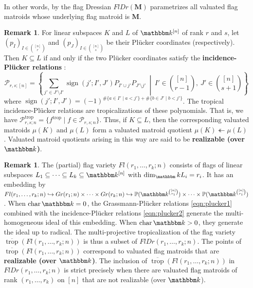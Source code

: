 \documentclass[11pt]{amsart}
\newcommand{\PP}{\mathbb P}
\newcommand{\trop}{\operatorname{trop}}
\newcommand{\MM}{{\boldsymbol M}}
\newcommand{\kk}{\mathbbm k}
\theoremstyle{definition}
\newtheorem{rem}[thm]{Remark}
\begin{document}
In other words, by  the flag Dressian $FlDr(\MM)$ parametrizes all valuated flag matroids whose underlying flag matroid is $\MM$.

\begin{rem}\label{rem:plucker}
For linear subspaces $K$ and $L$ of $\kk^{[n]}$ of rank $r$ and $s$, let $(p_I)_{I\in \binom{[n]}{r}}$ and $(p_J)_{I\in \binom{[n]}{s}}$ be their Pl\"ucker coordinates (respectively).  Then $K\subseteq L$ if and only if the two Pl\"ucker coordinates satisfy the \textbf{incidence-Pl\"ucker relations} \cite[\S 9, Lemma 2]{Ful97}:
\begin{equation}\label{eqn:plucker2}
\mathscr P_{r,s; [n]} = \left\{ \sum_{j'\in J'\setminus I'} \operatorname{sign}(j';I',J') P_{I'\cup j'}P_{J'\setminus j'} \ \middle| \ I'\in \binom{[n]}{r-1}, \ J' \in \binom{[n]}{s+1} \right\}
\end{equation}
where $\operatorname{sign}(j';I',J') = (-1)^{\#\{a\in I' \mid a< j'\} + \#\{b\in J' \mid b<j'\}}$.
The tropical incidence-Pl\"ucker relations are tropicalizations of these polynomials.  That is, we have $\mathscr P_{r,s;n}^{\trop} = \{f^{\trop} \mid f\in \mathscr P_{r,s;n}\}$.  Thus, if $K\subseteq L$, then the corresponding valuated matroids $\mu(K)$ and $\mu(L)$ form a valuated matroid quotient $\mu(K) \twoheadleftarrow \mu(L)$.  Valuated matroid quotients arising in this way are said to be \textbf{realizable (over $\kk$)}.
\end{rem}

\begin{rem}\label{rem:geomFlDr}
The (partial) flag variety $Fl(r_1, \ldots, r_k;n)$ consists of flags of linear subspaces $L_1 \subseteq \cdots \subseteq L_k \subseteq \kk^{[n]}$ with $\dim_\kk L_i = r_i$.   It has an embedding by $Fl(r_1, \ldots, r_k;n) \hookrightarrow Gr(r_1;n) \times \cdots \times Gr(r_k;n) \hookrightarrow \PP(\kk^{\binom{[n]}{r_1}}) \times \cdots \times \PP(\kk^{\binom{[n]}{r_1}})$.  When $\operatorname{char}\kk =0$, the Grassmann-Pl\"ucker relations \eqref{eqn:plucker1} combined with the incidence-Pl\"ucker relations \eqref{eqn:plucker2} generate the multi-homogeneous ideal of this embedding.  When $\operatorname{char}\kk >0$, they generate the ideal up to radical.  The multi-projective tropicalization of the flag variety $\overline{\trop}(Fl(r_1, \ldots, r_k;n))$ is thus a subset of $FlDr(r_1, \ldots, r_k;n)$.  The points of $\overline{\trop}(Fl(r_1, \ldots, r_k;n))$ correspond to valuated flag matroids that are \textbf{realizable (over $\kk$)}.  The inclusion of $\overline{\trop}(Fl(r_1, \ldots, r_k;n))$ in $FlDr(r_1, \ldots, r_k;n)$ is strict precisely when there are valuated flag matroids of rank $(r_1, \ldots, r_k)$ on $[n]$ that are not realizable (over $\kk$).
\end{rem}
\end{document}
